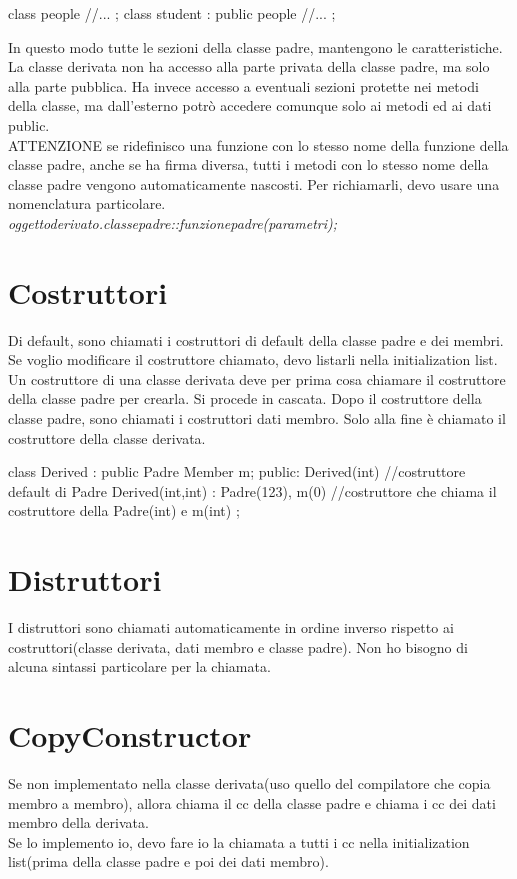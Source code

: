 \begin{cpp}
class people{
//...
};
class student : public people {
//...
};
\end{cpp}

In questo modo tutte le sezioni della classe padre, mantengono le caratteristiche. La classe derivata non ha accesso alla parte privata della classe padre, ma solo alla parte pubblica. Ha invece accesso a eventuali sezioni protette nei metodi della classe, ma dall'esterno potrò accedere comunque solo ai metodi ed ai dati public.\\

ATTENZIONE se ridefinisco una funzione con lo stesso nome della funzione della classe padre, anche se ha firma diversa, tutti i metodi con lo stesso nome della classe padre vengono automaticamente nascosti. Per richiamarli, devo usare una nomenclatura particolare.\\
\textit{oggettoderivato.classepadre::funzionepadre(parametri);}\\

\section{Costruttori}
Di default, sono chiamati i costruttori di default della classe padre e dei membri. Se voglio modificare il costruttore chiamato, devo listarli nella initialization list.\\
Un costruttore di una classe derivata deve per prima cosa chiamare il costruttore della classe padre per crearla. Si procede in cascata.  Dopo il costruttore della classe padre, sono chiamati i costruttori dati membro. Solo alla fine è chiamato il costruttore della classe derivata.

\begin{cpp}
class Derived : public Padre {
	Member m;
public:
	Derived(int) {} //costruttore default di Padre
	Derived(int,int) : Padre(123), m(0) {} //costruttore che chiama il costruttore della Padre(int) e m(int)
};
\end{cpp}

\section{Distruttori}
I distruttori sono chiamati automaticamente in ordine inverso rispetto ai costruttori(classe derivata, dati membro e classe padre). Non ho bisogno di alcuna sintassi particolare per la chiamata.

\section{CopyConstructor}
Se non implementato nella classe derivata(uso quello del compilatore che copia membro a membro), allora chiama il cc della classe padre e chiama i cc dei dati membro della derivata.\\
Se lo implemento io, devo fare io la chiamata a tutti i cc nella initialization list(prima della classe padre e poi dei dati membro).

